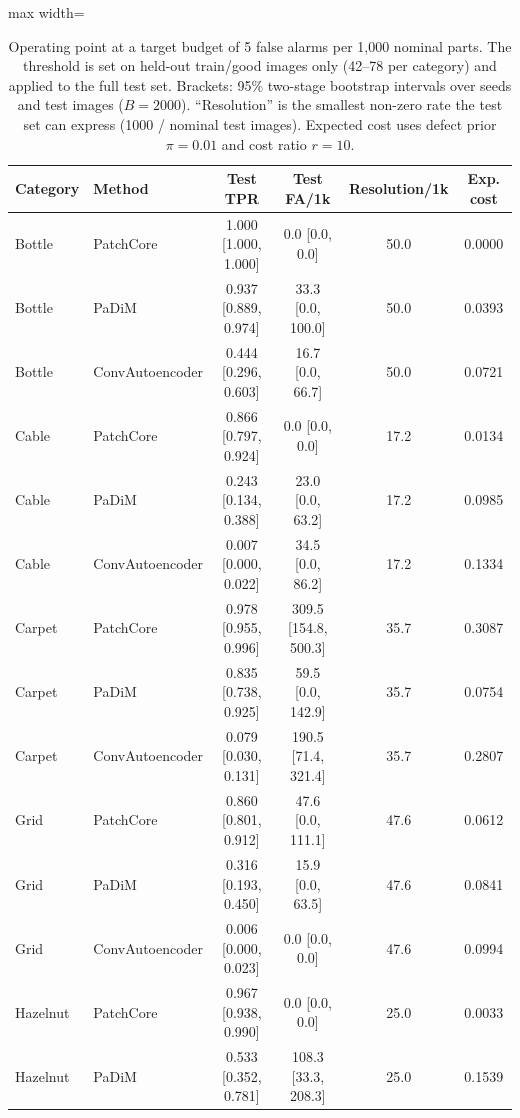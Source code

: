 \begin{table}[tbp]
\centering
\small
\caption{Operating point at a target budget of 5 false alarms per 1,000 nominal parts. The threshold is set on held-out train/good images only (42--78 per category) and applied to the full test set. Brackets: 95\% two-stage bootstrap intervals over seeds and test images ($B=2000$). ``Resolution'' is the smallest non-zero rate the test set can express (1000 / nominal test images). Expected cost uses defect prior $\pi=0.01$ and cost ratio $r=10$.}
\label{tab:operational}
\begin{adjustbox}{max width=\linewidth}
\begin{tabular}{llcccc}
\toprule
\textbf{Category} & \textbf{Method} & \textbf{Test TPR} & \textbf{Test FA/1k} & \textbf{Resolution/1k} & \textbf{Exp. cost} \\
\midrule
Bottle & PatchCore & 1.000 [1.000, 1.000] & 0.0 [0.0, 0.0] & 50.0 & 0.0000 \\
Bottle & PaDiM & 0.937 [0.889, 0.974] & 33.3 [0.0, 100.0] & 50.0 & 0.0393 \\
Bottle & ConvAutoencoder & 0.444 [0.296, 0.603] & 16.7 [0.0, 66.7] & 50.0 & 0.0721 \\
\midrule
Cable & PatchCore & 0.866 [0.797, 0.924] & 0.0 [0.0, 0.0] & 17.2 & 0.0134 \\
Cable & PaDiM & 0.243 [0.134, 0.388] & 23.0 [0.0, 63.2] & 17.2 & 0.0985 \\
Cable & ConvAutoencoder & 0.007 [0.000, 0.022] & 34.5 [0.0, 86.2] & 17.2 & 0.1334 \\
\midrule
Carpet & PatchCore & 0.978 [0.955, 0.996] & 309.5 [154.8, 500.3] & 35.7 & 0.3087 \\
Carpet & PaDiM & 0.835 [0.738, 0.925] & 59.5 [0.0, 142.9] & 35.7 & 0.0754 \\
Carpet & ConvAutoencoder & 0.079 [0.030, 0.131] & 190.5 [71.4, 321.4] & 35.7 & 0.2807 \\
\midrule
Grid & PatchCore & 0.860 [0.801, 0.912] & 47.6 [0.0, 111.1] & 47.6 & 0.0612 \\
Grid & PaDiM & 0.316 [0.193, 0.450] & 15.9 [0.0, 63.5] & 47.6 & 0.0841 \\
Grid & ConvAutoencoder & 0.006 [0.000, 0.023] & 0.0 [0.0, 0.0] & 47.6 & 0.0994 \\
\midrule
Hazelnut & PatchCore & 0.967 [0.938, 0.990] & 0.0 [0.0, 0.0] & 25.0 & 0.0033 \\
Hazelnut & PaDiM & 0.533 [0.352, 0.781] & 108.3 [33.3, 208.3] & 25.0 & 0.1539 \\

\end{tabular}
\end{adjustbox}
\end{table}

